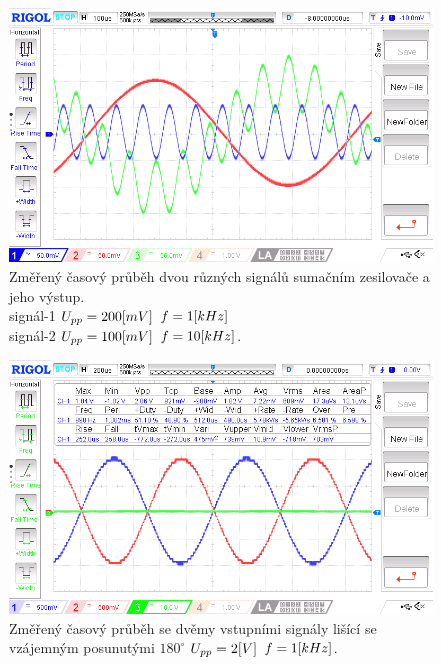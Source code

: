\documentclass{article}
\begin{document}
\begin{figure}[H]
  \begin{minipage}[t]{0.48\textwidth}
    \centering
    \includegraphics[width=\textwidth]{LAB/NewFile3.png}
    Změřený časový průběh dvou různých signálů sumačním zesilovače a jeho výstup. \\
    signál-1 \(U_{pp} = 200\-[mV]\) \(f = 1\-[kHz]\) \\
    signál-2 \(U_{pp} = 100\-[mV]\) \(f = 10\-[kHz]\).
  \end{minipage}
  \hfill
  \begin{minipage}[t]{0.48\textwidth}
    \centering
    \includegraphics[width=\textwidth]{LAB/NewFile6.png}
    Změřený časový průběh se dvěmy vstupními signály lišící se vzájemným posunutými \(180^\circ\) \(U_{pp} = 2\-[V]\) \(f = 1\-[kHz]\).
  \end{minipage}
\end{figure}
\end{document}
